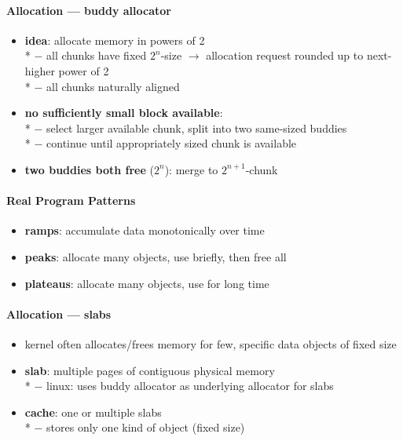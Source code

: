 \paragraph{Allocation --- buddy allocator}
\begin{itemize}
  \item \textbf{idea}: allocate memory in powers of 2 \\*
    $ - $ all chunks have fixed $ 2^n $-size $ \to $ allocation request rounded up to next-higher power of 2 \\*
    $ - $ all chunks naturally aligned
  \item \textbf{no sufficiently small block available}: \\*
    $ - $ select larger available chunk, split into two same-sized buddies \\*
    $ - $ continue until appropriately sized chunk is available
  \item \textbf{two buddies both free} ($ 2^n $): merge to $ 2^{n+1} $-chunk
\end{itemize}

\paragraph{Real Program Patterns}
\begin{itemize}
  \item \textbf{ramps}: accumulate data monotonically over time
  \item \textbf{peaks}: allocate many objects, use briefly, then free all
  \item \textbf{plateaus}: allocate many objects, use for long time
\end{itemize}

\paragraph{Allocation --- slabs}
\begin{itemize}
  \item kernel often allocates/frees memory for few, specific data objects of fixed size
  \item \textbf{slab}: multiple pages of contiguous physical memory \\*
    $ - $ linux: uses buddy allocator as underlying allocator for slabs
  \item \textbf{cache}: one or multiple slabs \\*
    $ - $ stores only one kind of object (fixed size)
\end{itemize}

